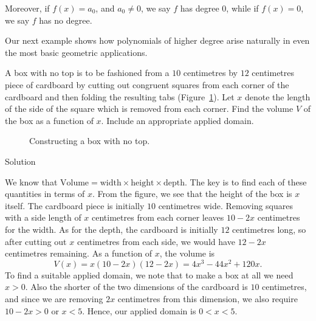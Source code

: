 Moreover, if $f(x) = a_0$, and $a_0 \neq 0$, we say $f$ has degree $0$, while if $f(x) = 0$, we say $f$ has no degree.

\ifvc
Our next example shows how polynomials of higher degree arise naturally in even the most basic geometric applications.

\begin{example}  
 A box with no top is to be fashioned from a $10$ centimetres by $12$ centimetres piece of cardboard by cutting out congruent squares from each corner of the cardboard and then folding the resulting tabs (Figure~\ref{fig_algebraic_7}).  Let $x$ denote the length of the side of the square which is removed from each corner.  Find the volume $V$ of the box as a function of $x$.  Include an appropriate applied domain.
 
 \begin{figure}[H]
\centering
\centerline{
\hspace{0.5cm}
}
\caption{Constructing a box with no top. }
\label{fig_algebraic_7}
\end{figure}


Solution 

We know that $\mbox{Volume} = \mbox{width} \times \mbox{height} \times \mbox{depth}$.  The key is to find each of these quantities in terms of $x$.  From the figure, we see that the height of the box is $x$ itself.  The cardboard piece is initially $10$ centimetres wide.  Removing squares with a side length of $x$ centimetres from each corner leaves $10-2x$ centimetres for the width.  As for the depth, the cardboard is initially $12$ centimetres long, so after cutting out $x$ centimetres from each side, we would have $12-2x$ centimetres remaining.   As a function of $x$, the volume is \[V(x) = x(10-2x)(12-2x) = 4x^3-44x^2+120x.\] To find a suitable applied domain, we note that to make a box at all we need $x > 0$.  Also the shorter of the two dimensions of the cardboard is $10$ centimetres, and since we are removing $2x$ centimetres from this dimension, we also require $10 - 2x > 0$ or $x < 5$.  Hence, our applied domain is $0 < x < 5$.

\end{example} 
\fi

